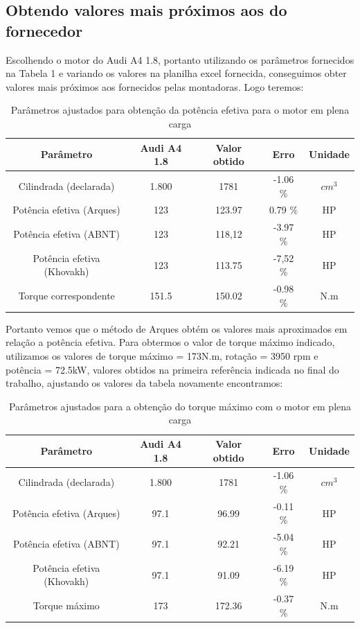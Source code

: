 \documentclass[a4paper]{article}
\begin{document}
\subsection{Obtendo valores mais próximos aos do fornecedor}
Escolhendo o motor do Audi A4 1.8, portanto utilizando os parâmetros fornecidos na Tabela 1 e variando os valores na planilha excel fornecida, conseguimos obter valores mais próximos aos fornecidos pelas montadoras. Logo teremos:

\begin{table}[ht]
    \centering
    \begin{tabular}{|c|c|c|c|c|}
        \hline
    Parâmetro &	Audi A4 1.8 & Valor obtido & Erro & Unidade\\
    \hline
    Cilindrada (declarada) & 1.800 & 1781 & -1.06 \% & \(cm^{3}\)\\
    \hline
    Potência efetiva (Arques) & 123 & 123.97 & 0.79 \% & HP\\
    \hline
    Potência efetiva (ABNT) & 123 & 118,12 & -3.97 \% & HP\\
    \hline
    Potência efetiva (Khovakh) & 123 & 113.75 & -7,52 \% & HP\\
    \hline
    Torque correspondente &	151.5 & 150.02 & -0.98 \% & N.m\\
    \hline
    \end{tabular}
    \caption{Parâmetros ajustados para obtenção da potência efetiva para o motor em plena carga}
\end{table}

Portanto vemos que o método de Arques obtém os valores mais aproximados em relação a potência efetiva. Para obtermos o valor de torque máximo indicado, utilizamos os valores de torque máximo = 173N.m, rotação = 3950 rpm  e potência = 72.5kW, valores obtidos na primeira referência indicada no final do trabalho, ajustando os valores da tabela novamente encontramos:

\begin{table}[ht]
    \centering
    \begin{tabular}{|c|c|c|c|c|}
        \hline
    Parâmetro &	Audi A4 1.8 & Valor obtido & Erro & Unidade\\
    \hline
    Cilindrada (declarada) & 1.800 & 1781 & -1.06 \% & \(cm^{3}\)\\
    \hline
    Potência efetiva (Arques) & 97.1 & 96.99 & -0.11 \% & HP\\
    \hline
    Potência efetiva (ABNT) & 97.1 & 92.21 & -5.04 \% & HP\\
    \hline
    Potência efetiva (Khovakh) & 97.1 & 91.09 & -6.19 \% & HP\\
    \hline
    Torque máximo &	173 & 172.36 & -0.37 \% & N.m\\
    \hline
    \end{tabular}
    \caption{Parâmetros ajustados para a obtenção do torque máximo com o motor em plena carga}
\end{table}
\end{document}
